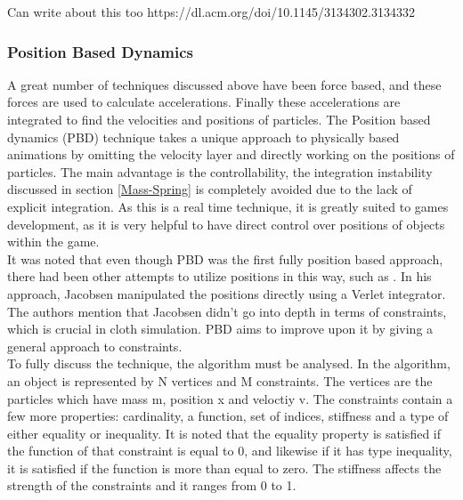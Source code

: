 \documentclass[12pt,a4paper]{article}
\begin{document}
Can write about this too https://dl.acm.org/doi/10.1145/3134302.3134332


\subsubsection{Position Based Dynamics}
A great number of techniques discussed above have been force based, and these forces are used to calculate accelerations. Finally these accelerations are integrated to find the velocities and positions of particles. The Position based dynamics (PBD) technique takes a unique approach to physically based animations by omitting the velocity layer and directly working on the positions of particles. \cite{muller2007position} The main advantage is the controllability, the integration instability discussed in section \ref{Mass-Spring} is completely avoided due to the lack of explicit integration. As this is a real time technique, it is greatly suited to games development, as it is very helpful to have direct control over positions of objects within the game.\\

It was noted that even though PBD was the first fully position based approach, there had been other attempts to utilize positions in this way, such as \cite{fisixArticle}. In his approach, Jacobsen manipulated the positions directly using a Verlet integrator. The authors mention that Jacobsen didn't go into depth in terms of constraints, which is crucial in cloth simulation. PBD aims to improve upon it by giving a general approach to constraints.\\

To fully discuss the technique, the algorithm must be analysed. In the algorithm, an object is represented by N vertices and M constraints. The vertices are the particles which have mass m, position x and veloctiy v. The constraints contain a few more properties: cardinality, a function, set of indices, stiffness and a type of either equality or inequality. It is noted that the equality property is satisfied if the function of that constraint is equal to 0, and likewise if it has type inequality, it is satisfied if the function is more than equal to zero. The stiffness affects the strength of the constraints and it ranges from 0 to 1.
\end{document}
